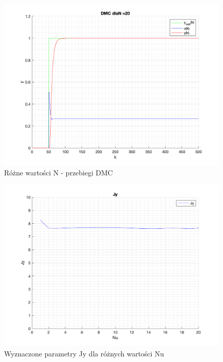 \documentclass[a4paper, 11pt]{article}
\begin{document}
\begin{enumerate}
 \begin{figure} [H]
\centering
  \includegraphics[width=\linewidth]{./ModelsP4_N/P4_DMC_N_20_png.png} 
 \caption[Różne wartości N - przebiegi DMC]
{Różne wartości N - przebiegi DMC}
 \end{figure}
 \begin{figure} [h]
\centering
  \includegraphics[width=\linewidth]{./ModelsP4_J/JyNu.png} 
 \caption[Wyznaczone parametry Jy dla różnych wartości Nu]
{Wyznaczone parametry Jy dla różnych wartości Nu}
 \end{figure}
 

\end{enumerate}
\end{document}
